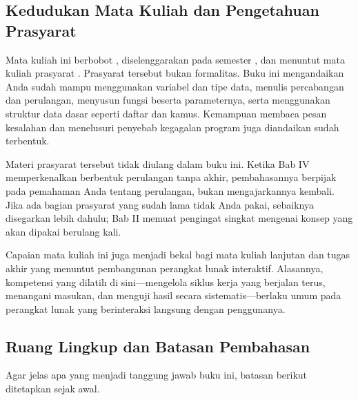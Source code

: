 \subsection{Kedudukan Mata Kuliah dan Pengetahuan Prasyarat}

Mata kuliah ini berbobot \BobotSKS, diselenggarakan pada semester
\SemesterMK, dan menuntut mata kuliah prasyarat \MataKuliahPrasyarat.
Prasyarat tersebut bukan formalitas. Buku ini mengandaikan Anda sudah mampu
menggunakan variabel dan tipe data, menulis percabangan dan perulangan,
menyusun fungsi beserta parameternya, serta menggunakan struktur data dasar
seperti daftar dan kamus. Kemampuan membaca pesan kesalahan dan menelusuri
penyebab kegagalan program juga diandaikan sudah terbentuk.

Materi prasyarat tersebut tidak diulang dalam buku ini. Ketika Bab IV
memperkenalkan  berbentuk perulangan tanpa akhir,
pembahasannya berpijak pada pemahaman Anda tentang perulangan, bukan
mengajarkannya kembali. Jika ada bagian prasyarat yang sudah lama tidak Anda
pakai, sebaiknya disegarkan lebih dahulu; Bab II memuat pengingat singkat
mengenai konsep yang akan dipakai berulang kali.

Capaian mata kuliah ini juga menjadi bekal bagi mata kuliah lanjutan dan
tugas akhir yang menuntut pembangunan perangkat lunak interaktif. Alasannya,
kompetensi yang dilatih di sini---mengelola siklus kerja yang berjalan terus,
menangani masukan, dan menguji hasil secara sistematis---berlaku umum pada
perangkat lunak yang berinteraksi langsung dengan penggunanya.

\subsection{Ruang Lingkup dan Batasan Pembahasan}

Agar jelas apa yang menjadi tanggung jawab buku ini, batasan berikut
ditetapkan sejak awal.

